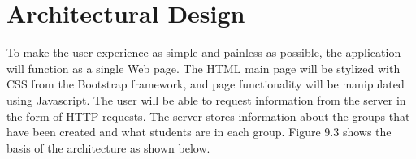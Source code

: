 \chapter{Architectural Design}
To make the user experience as simple and painless as possible, the application will function as a single Web page. The HTML main page will be stylized with CSS from the Bootstrap framework, and page functionality will be manipulated using Javascript. The user will be able to request information from the server in the form of HTTP requests. The server stores information about the groups that have been created and what students are in each group. Figure 9.3 shows the basis of the architecture as shown below.

